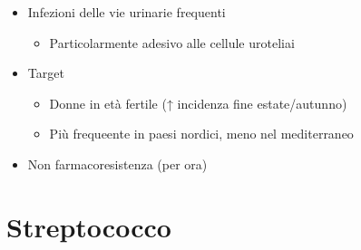 \documentclass[italian,]{article}
\providecommand{\tightlist}{%
  \setlength{\itemsep}{0pt}\setlength{\parskip}{0pt}}
\begin{document}
\begin{itemize}
\tightlist
\item
  Infezioni delle vie urinarie frequenti

  \begin{itemize}
  \tightlist
  \item
    Particolarmente adesivo alle cellule uroteliai
  \end{itemize}
\item
  Target

  \begin{itemize}
  \tightlist
  \item
    Donne in età fertile (↑ incidenza fine estate/autunno)
  \item
    Più frequeente in paesi nordici, meno nel mediterraneo
  \end{itemize}
\item
  Non farmacoresistenza (per ora)
\end{itemize}

\hypertarget{streptococco}{%
\section{Streptococco}\label{streptococco}}
\end{document}
